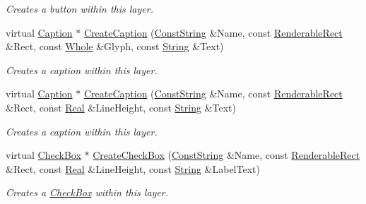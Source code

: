 \begin{DoxyCompactItemize}
\begin{DoxyCompactList}\small\item\em Creates a button within this layer. \item\end{DoxyCompactList}\item 
virtual \hyperlink{classMezzanine_1_1UI_1_1Caption}{Caption} $\ast$ \hyperlink{classMezzanine_1_1UI_1_1Layer_a3849f71d1ea5bf31c2a6a0773d5ac309}{CreateCaption} (\hyperlink{namespaceMezzanine_a63cd699ac54b73953f35ec9cfc05e506}{ConstString} \&Name, const \hyperlink{structMezzanine_1_1UI_1_1RenderableRect}{RenderableRect} \&Rect, const \hyperlink{namespaceMezzanine_adcbb6ce6d1eb4379d109e51171e2e493}{Whole} \&Glyph, const \hyperlink{namespaceMezzanine_acf9fcc130e6ebf08e3d8491aebcf1c86}{String} \&Text)
\begin{DoxyCompactList}\small\item\em Creates a caption within this layer. \item\end{DoxyCompactList}\item 
virtual \hyperlink{classMezzanine_1_1UI_1_1Caption}{Caption} $\ast$ \hyperlink{classMezzanine_1_1UI_1_1Layer_a9b7d6e9d2865a8e5ac03732888f22647}{CreateCaption} (\hyperlink{namespaceMezzanine_a63cd699ac54b73953f35ec9cfc05e506}{ConstString} \&Name, const \hyperlink{structMezzanine_1_1UI_1_1RenderableRect}{RenderableRect} \&Rect, const \hyperlink{namespaceMezzanine_a726731b1a7df72bf3583e4a97282c6f6}{Real} \&LineHeight, const \hyperlink{namespaceMezzanine_acf9fcc130e6ebf08e3d8491aebcf1c86}{String} \&Text)
\begin{DoxyCompactList}\small\item\em Creates a caption within this layer. \item\end{DoxyCompactList}\item 
virtual \hyperlink{classMezzanine_1_1UI_1_1CheckBox}{CheckBox} $\ast$ \hyperlink{classMezzanine_1_1UI_1_1Layer_a04e2d1bff31f8c01063498ce87e3138a}{CreateCheckBox} (\hyperlink{namespaceMezzanine_a63cd699ac54b73953f35ec9cfc05e506}{ConstString} \&Name, const \hyperlink{structMezzanine_1_1UI_1_1RenderableRect}{RenderableRect} \&Rect, const \hyperlink{namespaceMezzanine_a726731b1a7df72bf3583e4a97282c6f6}{Real} \&LineHeight, const \hyperlink{namespaceMezzanine_acf9fcc130e6ebf08e3d8491aebcf1c86}{String} \&LabelText)
\begin{DoxyCompactList}\small\item\em Creates a \hyperlink{classMezzanine_1_1UI_1_1CheckBox}{CheckBox} within this layer. \item\end{DoxyCompactList}\item 

\end{DoxyCompactItemize}
